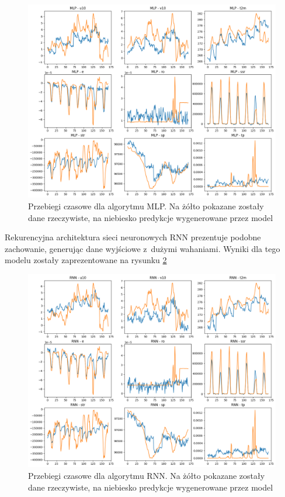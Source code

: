 \begin{figure}[H]
    \centering
    \includegraphics[width=\textwidth]{images/MLP_week.png}
    \caption{Przebiegi czasowe dla algorytmu MLP. Na żółto pokazane zostały dane 
    rzeczywiste, na niebiesko predykcje wygenerowane przez model}
    \label{mlp-week}
\end{figure}

Rekurencyjna architektura sieci neuronowych RNN prezentuje podobne zachowanie, 
generując dane wyjściowe z~dużymi wahaniami. Wyniki dla tego modelu zostały zaprezentowane na rysunku \ref{rnn-week}

\begin{figure}[H]
    \centering
    \includegraphics[width=\textwidth]{images/rnn_week.png}
    \caption{Przebiegi czasowe dla algorytmu RNN. Na żółto pokazane zostały dane 
    rzeczywiste, na niebiesko predykcje wygenerowane przez model}
    \label{rnn-week}
\end{figure}

